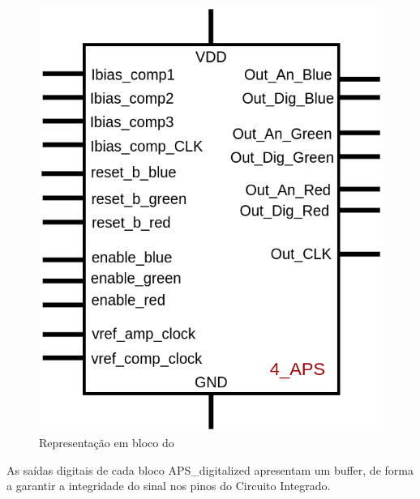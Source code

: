 \begin{figure}[htb]
 \centering
    \centering
    \caption{Representa{\c c}\~ao em bloco do \NomeBloco} \label{\NomeSFig}
    \includegraphics[scale=0.3]{Circuitos/4APS_block.png}
\end{figure}

As sa\'idas digitais de cada bloco APS\_digitalized apresentam um buffer, de forma a garantir a integridade do sinal nos pinos do Circuito Integrado.
\clearpage